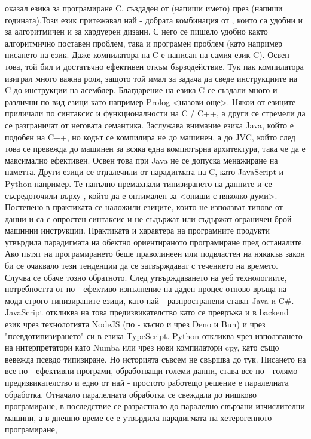 оказал езика за програмиране C, създаден от (напиши името) през (напиши годината).Този език притежавал най - добрата 
комбинация от , които са удобни и за алгоритмичен и за хардуерен дизаин. С него се пишело удобно както алгоритмично 
поставен проблем, така и програмен проблем (като например писането на език. Даже компилатора на C е написан на самия език C). 
Освен това, той бил и достатъчно ефективен откъм бързодействие. Тук пак компилатора изиграл много важна роля, 
защото той имал за задача да сведе инструкциите на C до инструкции на асемблер. Благдарение на езика C се създали
много и различни по вид езици като например Prolog <назови още>. Някои от езиците приличали по синтаксис 
и функционалности на C / C++, а други се стремели да се разграничат от неговата семантика. Заслужава внимание езика Java,
който е подобен на C++, но кодът се компилира не до машинен, а до JVC, който след това се превежда до машинен 
за всяка една компютърна архитектура, така че да е максимално ефективен. Освен това при Java не се допуска менажиране на паметта. 
Други езици се отдалечили от парадигмата на C, като JavaScript и Python например. Те напълно премахнали
типизирането на данните и се съсредоточили върху , който да е оптимален за <опиши с няколко думи>. 
Постепено в практиката се наложили езиците, които не използват типове от данни и са с опростен синтаксис и не съдържат
или съдържат ограничен брой машинни инструкции. Практиката и характера на програмните продукти утвърдила парадигмата 
на обектно ориентираното програмиране пред останалите. Ако пътят на програмирането беше праволинеен 
или подвластен на някакъв закон би се очаквало тези тенденции да се затвърждават с течението на времето. 
Случва се обаче тозно обратното. След утвърждаването на уеб технологиите, потребността от по - ефективо изпълнение на
даден процес отново връща на мода строго типизираните езици, като най - разпространени стават Java и C#.
JavaScript откликва на това предизвикателство като се превръжа и в backend език чрез технологията NodeJS 
(по - късно и чрез Deno и Bun) и чрез "псевдотипизирането" си в езика TypeScript. Python откликва чрез използването 
на  интерпретатори като Numba или чрез нови компилатори cpy, като също вевежда псевдо типизиране. 
Но историята съвсем не свършва до тук. Писането на все по - ефективни програми, обработващи големи данни,
става все по - голямо предизвикателство и едно от най - простото работещо решение е паралелната обработка. 
Отначало паралелната обработка се свеждала до нишково програмиране, в последствие се разрастнало до 
паралелно свързани изчислителни машини, а в днешно време се е утвърдила парадигмата на хетерогенното програмиране,
